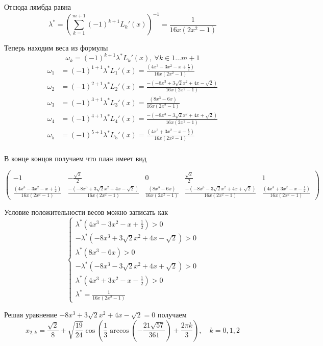 \documentclass[12pt,a4paper]{article}
\begin{document}
	\noindent Отсюда лямбда равна
	\[
	\lambda^* = 
	\left( \sum_{k=1}^{m+1} (-1)^{k+1}  L_k'(x) \right) ^ {-1} = 
	\frac{1}{16x(2x^2-1)}
	\]
	
	\noindent Теперь находим веса из формулы
	\[\omega_k  = (-1)^{k+1} \lambda^* L_k'(x), \ \forall k \in 1 \ldots m+1 \]
	\begin{align*}
		\omega_1 &= 
		(-1)^{1+1} \lambda^* L_1'(x) = 
		\frac{(4x^3 -3x^2-x+\frac{1}{2})}{16x(2x^2-1)}\\[3mm]
		\omega_2 &= 
		(-1)^{2+1} \lambda^* L_2'(x) = 
		\frac{- (-8x^3 + 3\sqrt{2}x^2 + 4x - \sqrt{2})}{16x(2x^2-1)}\\[3mm]
		\omega_3 &= 
		(-1)^{3+1} \lambda^* L_3'(x) = 
		\frac{(8x^3 - 6x)}{16x(2x^2-1)}\\[3mm]
		\omega_4 &= 
		(-1)^{4+1} \lambda^* L_4'(x) = 
		\frac{-(-8x^3 - 3\sqrt{2}x^2 + 4x + \sqrt{2})}{16x(2x^2-1)}\\[3mm]
		\omega_5 &= 
		(-1)^{5+1} \lambda^* L_5'(x) = 
		\frac{(4x^3 + 3x^2 -x - \frac{1}{2})}{16x(2x^2-1)}\\
	\end{align*}
	
	\noindent В конце концов получаем что план имеет вид
	
	\[
	\begin{pmatrix}
	-1 & -\frac{\sqrt2}{2} & 0 & \frac{\sqrt2}{2} & 1 \\
	\frac{(4x^3 -3x^2-x+\frac{1}{2})}{16x(2x^2-1)} &
	\frac{- (-8x^3 + 3\sqrt{2}x^2 + 4x - \sqrt{2})}{16x(2x^2-1)} &
	\frac{(8x^3 - 6x)}{16x(2x^2-1)} &
	\frac{-(-8x^3 - 3\sqrt{2}x^2 + 4x + \sqrt{2})}{16x(2x^2-1)} &
	\frac{(4x^3 + 3x^2 -x - \frac{1}{2})}{16x(2x^2-1)}
	\end{pmatrix}
	\]
	
	\newpage
	\noindent Условие положительности весов можно записать как
	\[
	\begin{cases}
		\lambda^* (4x^3 -3x^2-x+\frac{1}{2}) > 0 \\
		- \lambda^* (-8x^3 + 3\sqrt{2}x^2 + 4x - \sqrt{2}) > 0 \\
		\lambda^* (8x^3 - 6x) > 0 \\
		-\lambda^* (-8x^3 - 3\sqrt{2}x^2 + 4x + \sqrt{2}) > 0 \\
		\lambda^* (4x^3 + 3x^2 -x - \frac{1}{2}) > 0 \\
		\lambda^* = \frac{1}{16x(2x^2-1)}
	\end{cases}
	\]
	
	
	\noindent Решая уравнение $-8x^3 + 3\sqrt{2}x^2 + 4x - \sqrt{2} = 0$ получаем
	\[
	x_{2,k} = \frac{\sqrt2}{8} + 
	\sqrt{\frac{19}{24}} 
	\cos 
	\left(
	\frac{1}{3} 
		\arccos 
		\left(
		-\frac{21\sqrt{57}}{361}
		\right)
	+ \frac{2 \pi k}{3}
	\right), \quad k=0,1,2
	\]
	
\end{document}
